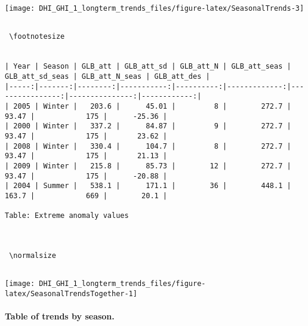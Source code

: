 \documentclass[
  10pt,
  a4paper,oneside]{article}
\begin{document}
\begin{center}\texttt{[image: DHI\_GHI\_1\_longterm\_trends\_files/figure-latex/SeasonalTrends-3]} \end{center}

\begin{verbatim}
 
 \footnotesize 
 

| Year | Season | GLB_att | GLB_att_sd | GLB_att_N | GLB_att_seas | GLB_att_sd_seas | GLB_att_N_seas | GLB_att_des |
|-----:|-------:|--------:|-----------:|----------:|-------------:|----------------:|---------------:|------------:|
| 2005 | Winter |   203.6 |      45.01 |         8 |        272.7 |           93.47 |            175 |      -25.36 |
| 2000 | Winter |   337.2 |      84.87 |         9 |        272.7 |           93.47 |            175 |       23.62 |
| 2008 | Winter |   330.4 |      104.7 |         8 |        272.7 |           93.47 |            175 |       21.13 |
| 2009 | Winter |   215.8 |      85.73 |        12 |        272.7 |           93.47 |            175 |      -20.88 |
| 2004 | Summer |   538.1 |      171.1 |        36 |        448.1 |           163.7 |            669 |        20.1 |

Table: Extreme anomaly values


 
 \normalsize 
 
\end{verbatim}

\begin{center}\texttt{[image: DHI\_GHI\_1\_longterm\_trends\_files/figure-latex/SeasonalTrendsTogether-1]} \end{center}

\newpage
\FloatBarrier

\hypertarget{table-of-trends-by-season.}{%
\paragraph{Table of trends by season.}\label{table-of-trends-by-season.}}
\end{document}
